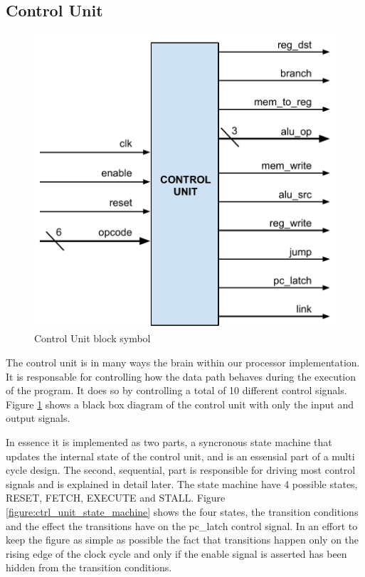 \subsection{Control Unit}

\begin{figure}[h]
    \centering\includegraphics[scale=0.5]{figures/control_unit_block_symbol}
    \caption{Control Unit block symbol}
    \label{figure:ctrl_unit_block_symbol}    
\end{figure}
The control unit is in many ways the brain within our processor implementation. It is responsable for controlling how the data path behaves during the execution of the program. It does so by controlling a total of 10 different control signals. Figure \ref{figure:ctrl_unit_block_symbol} shows a black box diagram of the control unit with only the input and output signals.

In essence it is implemented as two parts, a syncronous state machine that updates the internal state of the control unit, and is an essensial part of a multi cycle design. The second, sequential, part is responsible for driving most control signals and is explained in detail later. The state machine have 4 possible states, RESET, FETCH, EXECUTE and STALL. Figure \ref{figure:ctrl_unit_state_machine} shows the four states, the transition conditions and the effect the transitions have on the pc\_latch control signal. In an effort to keep the figure as simple as possible the fact that transitions happen only on the rising edge of the clock cycle and only if the enable signal is asserted has been hidden from the transition conditions.


